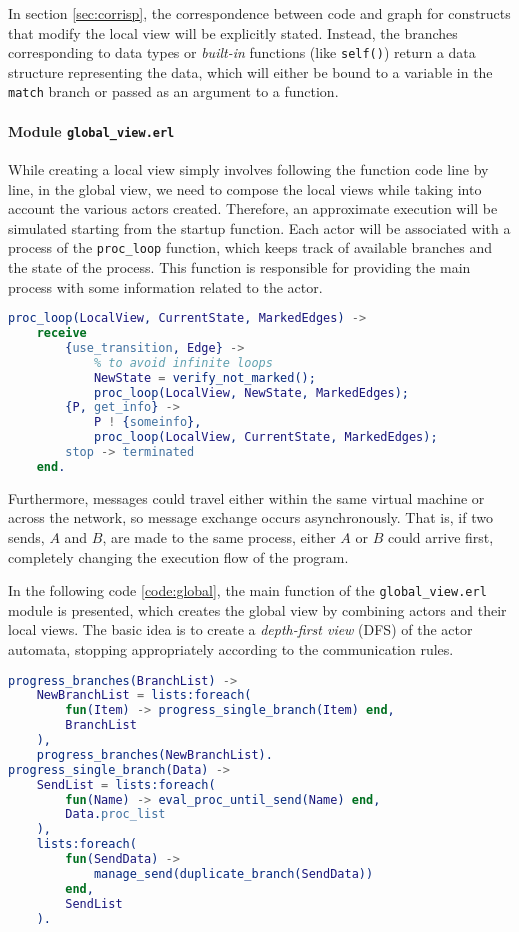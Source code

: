 In section \ref{sec:corrisp}, the correspondence between code and graph for constructs that modify the local view will be explicitly stated. Instead, the branches corresponding to data types or \textit{built-in} functions (like \texttt{self()}) return a data structure representing the data, which will either be bound to a variable in the \texttt{match} branch or passed as an argument to a function.

\paragraph{Module \texttt{global\_view.erl}}

While creating a local view simply involves following the function code line by line, in the global view, we need to compose the local views while taking into account the various actors created. Therefore, an approximate execution will be simulated starting from the startup function. Each actor will be associated with a process of the \texttt{proc\_loop} function, which keeps track of available branches and the state of the process. This function is responsible for providing the main process with some information related to the actor.

\begin{lstlisting}[language=Erlang, caption=Pseudocode of \texttt{proc\_loop} function]
proc_loop(LocalView, CurrentState, MarkedEdges) ->
    receive
        {use_transition, Edge} ->
            % to avoid infinite loops
            NewState = verify_not_marked();
            proc_loop(LocalView, NewState, MarkedEdges);
        {P, get_info} ->
            P ! {someinfo},
            proc_loop(LocalView, CurrentState, MarkedEdges);
        stop -> terminated
    end.
\end{lstlisting}

Furthermore, messages could travel either within the same virtual machine or across the network, so message exchange occurs asynchronously. That is, if two sends, $A$ and $B$, are made to the same process, either $A$ or $B$ could arrive first, completely changing the execution flow of the program.

In the following code \ref{code:global}, the main function of the \texttt{global\_view.erl} module is presented, which creates the global view by combining actors and their local views. The basic idea is to create a \textit{depth-first view} (DFS) of the actor automata, stopping appropriately according to the communication rules.

\begin{lstlisting}[language=Erlang, caption=Main function for globalview construction, label=code:global]
progress_branches(BranchList) ->
    NewBranchList = lists:foreach(
        fun(Item) -> progress_single_branch(Item) end,
        BranchList
    ),
    progress_branches(NewBranchList).
progress_single_branch(Data) ->
    SendList = lists:foreach(
        fun(Name) -> eval_proc_until_send(Name) end,
        Data.proc_list
    ),
    lists:foreach(
        fun(SendData) -> 
            manage_send(duplicate_branch(SendData))
        end,
        SendList
    ).
\end{lstlisting}


